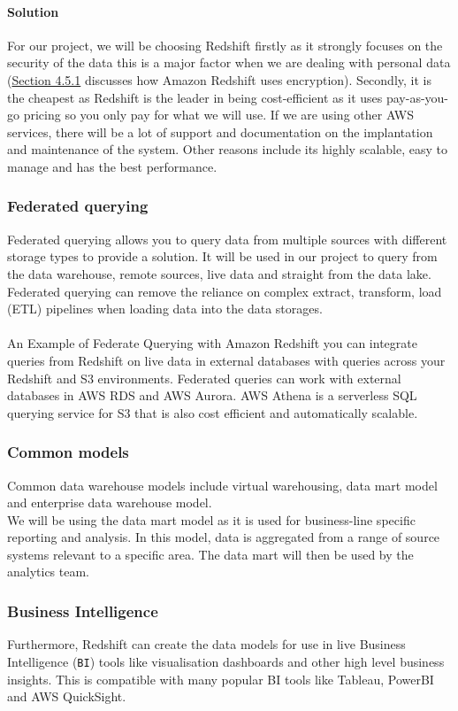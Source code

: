 \documentclass[10pt]{article}
\begin{document}
\paragraph{Solution}For our project, we will be choosing Redshift firstly as it strongly focuses on the security of the data this is a major factor when we are dealing with personal data (\hyperref[sec:secure_access]{Section 4.5.1} discusses how Amazon Redshift uses encryption). Secondly, it is the cheapest as Redshift is the leader in being cost-efficient as it uses pay-as-you-go pricing so you only pay for what we will use. If we are using other AWS services, there will be a lot of support and documentation on the implantation and maintenance of the system. Other reasons include its highly scalable, easy to manage and has the best performance.\cite{redshift-benefits} 
\subsubsection{Federated querying}
Federated querying allows you to query data from multiple sources with different storage types to provide a solution. It will be used in our project to query from the data warehouse, remote sources, live data and straight from the data lake. Federated querying can remove the reliance on complex extract, transform, load (ETL) pipelines when loading data into the data storages.
\\ \\
An Example of Federate Querying with Amazon Redshift \cite{federate-queries} you can integrate queries from Redshift on live data in external databases with queries across your Redshift and S3 environments. Federated queries can work with external databases in AWS RDS and AWS Aurora. AWS Athena is a serverless SQL querying service for S3 that is also cost efficient and automatically scalable.
\subsubsection{Common models}
Common data warehouse models \cite{data-modelling} include virtual warehousing, data mart model and enterprise data warehouse model.
\\
We will be using the data mart model as it is used for business-line specific reporting and analysis. In this model, data is aggregated from a range of source systems relevant to a specific area. The data mart will then be used by the analytics team.
\subsubsection{Business Intelligence}
Furthermore, Redshift can create the data models for use in live Business Intelligence (\texttt{BI}) tools like visualisation dashboards and other high level business insights. This is compatible with many popular BI tools like Tableau, PowerBI and AWS QuickSight.
\end{document}
